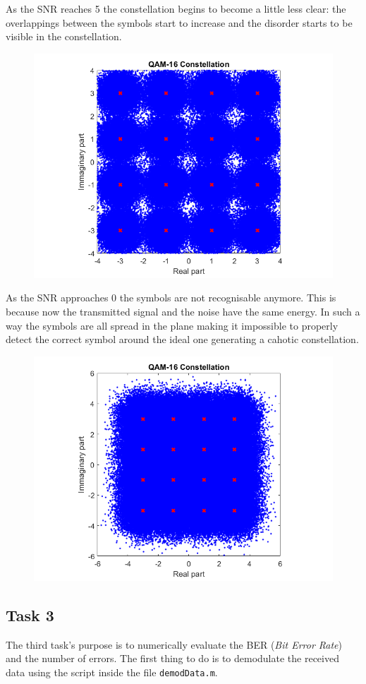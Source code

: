 \FloatBarrier\noindent As the SNR reaches 5 the constellation begins to become a little less clear: the overlappings between the symbols start to increase and the disorder starts to be visible in the constellation. 
\begin{figure}[!h]
    \centering
    \includegraphics[width = .7\textwidth]{lab-6/imgs/SNR5.png}
\end{figure}
\vspace{-10px}


\FloatBarrier\noindent As the SNR approaches 0 the symbols are not recognisable anymore. This is because now the transmitted signal and the noise have the same energy. In such a way the symbols are all spread in the plane making it impossible to properly detect the correct symbol around the ideal one generating a cahotic constellation.

\begin{figure}[!h]
    \centering
    \includegraphics[width = .7\textwidth]{lab-6/imgs/SNR0.png}
\end{figure}
\vspace{-10px}

\FloatBarrier\subsection*{Task 3}
The third task's purpose is to numerically evaluate the BER (\textsl{Bit Error Rate}) and the number of errors. The first thing to do is to demodulate the received data using the script inside the file \texttt{demodData.m}.

